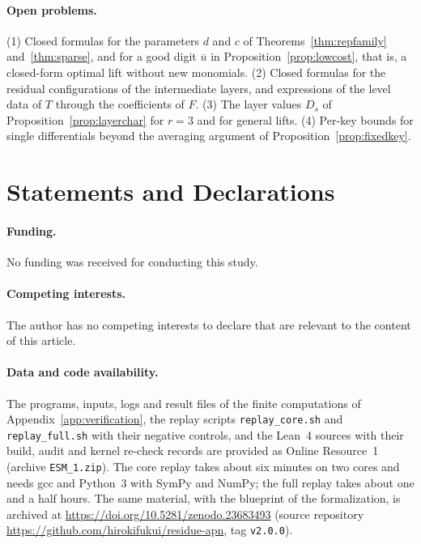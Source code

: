 \documentclass[11pt]{article}
\theoremstyle{definition}
\theoremstyle{remark}
\newcommand{\ol}[1]{\overline{#1}}
\begin{document}
\paragraph{Open problems.}
(1) Closed formulas for the parameters $d$ and $c$ of Theorems~\ref{thm:repfamily} and~\ref{thm:sparse}, and for a good
digit $\ol u$ in Proposition~\ref{prop:lowcost}, that is, a closed-form optimal lift without new monomials. (2) Closed
formulas for the residual configurations of the intermediate layers,
and expressions of the level data of $T$ through the coefficients of $F$. (3) The layer values $D_s$ of
Proposition~\ref{prop:layerchar} for $r=3$ and for general lifts. (4) Per-key bounds for single differentials beyond the
averaging argument of Proposition~\ref{prop:fixedkey}.

\section*{Statements and Declarations}

\paragraph{Funding.} No funding was received for conducting this study.

\paragraph{Competing interests.} The author has no competing interests to declare that are relevant to the content
of this article.

\paragraph{Data and code availability.} The programs, inputs, logs and result files of the finite computations of
Appendix~\ref{app:verification}, the replay scripts \texttt{replay\_core.sh} and \texttt{replay\_full.sh} with their
negative controls, and the Lean~4 sources with their build, audit and kernel re-check records are provided as
Online Resource~1 (archive \texttt{ESM\_1.zip}). The core replay takes about six minutes on two cores and needs gcc and
Python~3 with SymPy and NumPy; the full replay takes about one and a half hours. The same material, with the blueprint of the formalization, is archived at
\url{https://doi.org/10.5281/zenodo.23683493} (source repository \url{https://github.com/hirokifukui/residue-apn},
tag \texttt{v2.0.0}).
\end{document}
